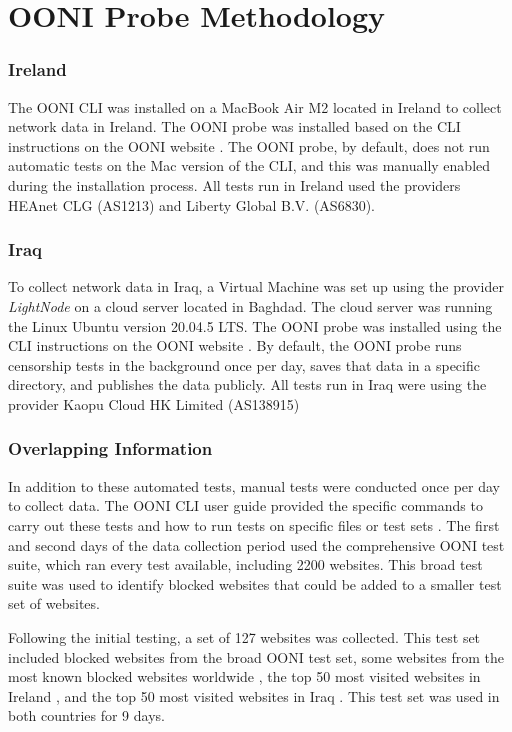 \section{OONI Probe Methodology}

\subsubsection{Ireland}

The OONI CLI was installed on a MacBook Air M2 located in Ireland to collect network data in Ireland. The OONI probe was installed based on the CLI instructions on the OONI website \cite{OONISCLI}. The OONI probe, by default, does not run automatic tests on the Mac version of the CLI, and this was manually enabled during the installation process. All tests run in Ireland used the providers HEAnet CLG (AS1213) and Liberty Global B.V. (AS6830).

\subsubsection{Iraq}

To collect network data in Iraq, a Virtual Machine was set up using the provider \textit{LightNode} \cite{lightnodeLightNodeGlobal} on a cloud server located in Baghdad. The cloud server was running the Linux Ubuntu version 20.04.5 LTS. The OONI probe was installed using the CLI instructions on the OONI website \cite{OONISCLI}. By default, the OONI probe runs censorship tests in the background once per day, saves that data in a specific directory, and publishes the data publicly. All tests run in Iraq were using the provider Kaopu Cloud HK Limited (AS138915)

\subsubsection{Overlapping Information}

In addition to these automated tests, manual tests were conducted once per day to collect data. The OONI CLI user guide provided the specific commands to carry out these tests and how to run tests on specific files or test sets \cite{ooniUserGuideCLI}. The first and second days of the data collection period used the comprehensive OONI test suite, which ran every test available, including 2200 websites. This broad test suite was used to identify blocked websites that could be added to a smaller test set of websites.

Following the initial testing, a set of 127 websites was collected. This test set included blocked websites from the broad OONI test set, some websites from the most known blocked websites worldwide \cite{blocksiteMostBlocked}, the top 50 most visited websites in Ireland \cite{top50irishwebsites}, and the top 50 most visited websites in Iraq \cite{top50IraqWebsites}. This test set was used in both countries for 9 days.

